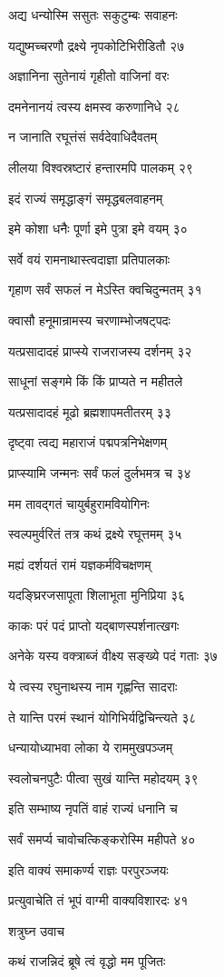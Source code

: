 अद्य धन्योस्मि ससुतः सकुटुम्बः सवाहनः

यद्युष्मच्चरणौ द्रक्ष्ये नृपकोटिभिरीडितौ २७

अज्ञानिना सुतेनायं गृहीतो वाजिनां वरः

दमनेनानयं त्वस्य क्षमस्व करुणानिधे २८

न जानाति रघूत्तंसं सर्वदेवाधिदैवतम्

लीलया विश्वस्रष्टारं हन्तारमपि पालकम् २९

इदं राज्यं समृद्धाङ्गं समृद्धबलवाहनम्

इमे कोशा धनैः पूर्णा इमे पुत्रा इमे वयम् ३०

सर्वे वयं रामनाथास्त्वदाज्ञा प्रतिपालकाः

गृहाण सर्वं सफलं न मेऽस्ति क्वचिदुन्मतम् ३१

क्वासौ हनूमान्रामस्य चरणाम्भोजषट्पदः

यत्प्रसादादहं प्राप्स्ये राजराजस्य दर्शनम् ३२

साधूनां सङ्गमे किं किं प्राप्यते न महीतले

यत्प्रसादादहं मूढो ब्रह्मशापमतीतरम् ३३

दृष्ट्वा त्वद्य महाराजं पद्मपत्रनिभेक्षणम्

प्राप्स्यामि जन्मनः सर्वं फलं दुर्लभमत्र च ३४

मम तावद्गतं चायुर्बहुरामवियोगिनः

स्वल्पमुर्वरितं तत्र कथं द्रक्ष्ये रघूत्तमम् ३५

मह्यं दर्शयतं रामं यज्ञकर्मविचक्षणम्

यदङ्घ्रिरजसापूता शिलाभूता मुनिप्रिया ३६

काकः परं पदं प्राप्तो यद्बाणस्पर्शनात्खगः

अनेके यस्य वक्त्राब्जं वीक्ष्य सङ्ख्ये पदं गताः ३७

ये त्वस्य रघुनाथस्य नाम गृह्णन्ति सादराः

ते यान्ति परमं स्थानं योगिभिर्यद्विचिन्त्यते ३८

धन्यायोध्याभवा लोका ये राममुखपञ्जम्

स्वलोचनपुटैः पीत्वा सुखं यान्ति महोदयम् ३९

इति सम्भाष्य नृपतिं वाहं राज्यं धनानि च

सर्वं समर्प्य चावोचत्किङ्करोस्मि महीपते ४०

इति वाक्यं समाकर्ण्य राज्ञः परपुरञ्जयः

प्रत्युवाचेति तं भूपं वाग्मी वाक्यविशारदः ४१

शत्रुघ्न उवाच

कथं राजन्निदं ब्रूषे त्वं वृद्धो मम पूजितः

